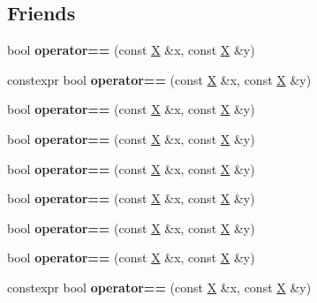 \subsection*{Friends}
\begin{DoxyCompactItemize}
\item 
\mbox{\label{class_x_a1651e729cc70ea9942f074061b09216a}} 
bool {\bfseries operator==} (const \mbox{\hyperlink{class_x}{X}} \&x, const \mbox{\hyperlink{class_x}{X}} \&y)
\item 
\mbox{\label{class_x_a9d441e76e2ab7afd90f64e49f2809fc7}} 
constexpr bool {\bfseries operator==} (const \mbox{\hyperlink{class_x}{X}} \&x, const \mbox{\hyperlink{class_x}{X}} \&y)
\item 
\mbox{\label{class_x_a1651e729cc70ea9942f074061b09216a}} 
bool {\bfseries operator==} (const \mbox{\hyperlink{class_x}{X}} \&x, const \mbox{\hyperlink{class_x}{X}} \&y)
\item 
\mbox{\label{class_x_a1651e729cc70ea9942f074061b09216a}} 
bool {\bfseries operator==} (const \mbox{\hyperlink{class_x}{X}} \&x, const \mbox{\hyperlink{class_x}{X}} \&y)
\item 
\mbox{\label{class_x_a1651e729cc70ea9942f074061b09216a}} 
bool {\bfseries operator==} (const \mbox{\hyperlink{class_x}{X}} \&x, const \mbox{\hyperlink{class_x}{X}} \&y)
\item 
\mbox{\label{class_x_a1651e729cc70ea9942f074061b09216a}} 
bool {\bfseries operator==} (const \mbox{\hyperlink{class_x}{X}} \&x, const \mbox{\hyperlink{class_x}{X}} \&y)
\item 
\mbox{\label{class_x_a1651e729cc70ea9942f074061b09216a}} 
bool {\bfseries operator==} (const \mbox{\hyperlink{class_x}{X}} \&x, const \mbox{\hyperlink{class_x}{X}} \&y)
\item 
\mbox{\label{class_x_a1651e729cc70ea9942f074061b09216a}} 
bool {\bfseries operator==} (const \mbox{\hyperlink{class_x}{X}} \&x, const \mbox{\hyperlink{class_x}{X}} \&y)
\item 
\mbox{\label{class_x_a9d441e76e2ab7afd90f64e49f2809fc7}} 
constexpr bool {\bfseries operator==} (const \mbox{\hyperlink{class_x}{X}} \&x, const \mbox{\hyperlink{class_x}{X}} \&y)

\end{DoxyCompactItemize}
